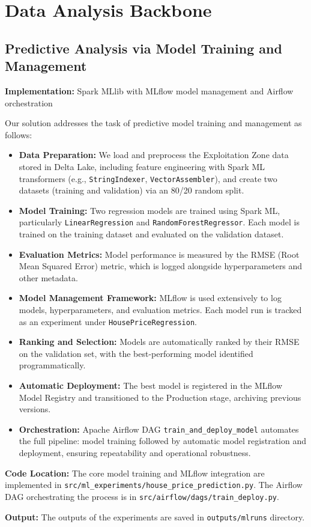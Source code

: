 \section{Data Analysis Backbone}
\subsection{Predictive Analysis via Model Training and Management}

\textbf{Implementation:} Spark MLlib with MLflow model management and Airflow orchestration

Our solution addresses the task of predictive model training and management as follows:

\begin{itemize}[nosep]
\item \textbf{Data Preparation:} We load and preprocess the Exploitation Zone data stored in Delta Lake, including feature engineering with Spark ML transformers (e.g., \texttt{StringIndexer}, \texttt{VectorAssembler}), and create two datasets (training and validation) via an 80/20 random split.
\item \textbf{Model Training:} Two regression models are trained using Spark ML, particularly \texttt{LinearRegression} and \texttt{RandomForestRegressor}. Each model is trained on the training dataset and evaluated on the validation dataset.
\item \textbf{Evaluation Metrics:} Model performance is measured by the RMSE (Root Mean Squared Error) metric, which is logged alongside hyperparameters and other metadata.
\item \textbf{Model Management Framework:} MLflow is used extensively to log models, hyperparameters, and evaluation metrics. Each model run is tracked as an experiment under \texttt{HousePriceRegression}.
\item \textbf{Ranking and Selection:} Models are automatically ranked by their RMSE on the validation set, with the best-performing model identified programmatically.
\item \textbf{Automatic Deployment:} The best model is registered in the MLflow Model Registry and transitioned to the Production stage, archiving previous versions.
\item \textbf{Orchestration:} Apache Airflow DAG \texttt{train\_and\_deploy\_model} automates the full pipeline: model training followed by automatic model registration and deployment, ensuring repeatability and operational robustness.
\end{itemize}

\bigskip

\textbf{Code Location:}
The core model training and MLflow integration are implemented in \texttt{src/ml\_experiments/house\_price\_prediction.py}. The Airflow DAG orchestrating the process is in \texttt{src/airflow/dags/train\_deploy.py}.

\textbf{Output:} The outputs of the experiments are saved in \texttt{outputs/mlruns} directory.

